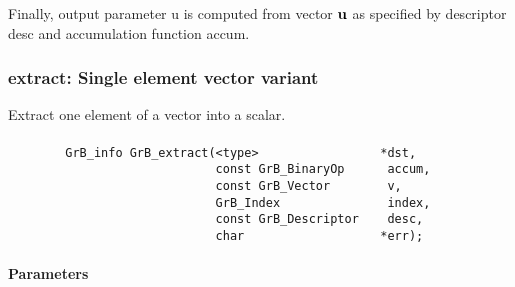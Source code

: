 Finally, output parameter {\sf u} is computed from vector ${\bf u}$ as
specified by descriptor {\sf desc} and accumulation function {\sf accum}.

\subsubsection{{\sf extract}: Single element vector variant}
\label{Sec:extract_single_element_vec}

Extract one element of a vector into a scalar. 

\paragraph{\syntax}

\begin{verbatim}
        GrB_info GrB_extract(<type>                 *dst,
                             const GrB_BinaryOp      accum,
                             const GrB_Vector        v,
                             GrB_Index               index,
                             const GrB_Descriptor    desc,
                             char                   *err); 
\end{verbatim}

\paragraph{Parameters}

